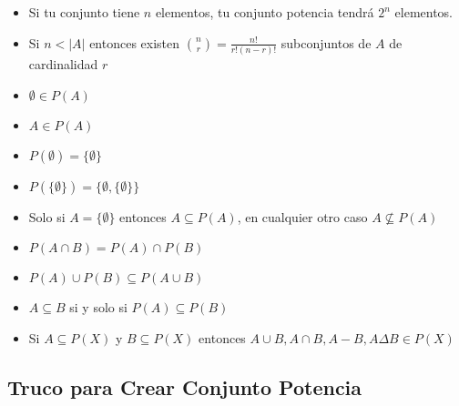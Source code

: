 \documentclass[12pt, fleqn]{report}                             %
\begin{document}
                \begin{itemize}
                    \item Si tu conjunto tiene $n$ elementos, tu conjunto potencia tendrá
                        $2^n$ elementos.

                    \item Si $n < |A|$ entonces existen $\binom{n}{r} = \frac{n!}{r!(n-r)!}$ 
                        subconjuntos de $A$ de cardinalidad $r$

                    \item $\emptyset \in P(A)$

                    \item $A \in P(A)$

                    \item $P(\emptyset) = \{\emptyset\}$

                    \item $P( \{\emptyset\}) = \{\emptyset, \{\emptyset\} \}$

                    \item Solo si $A = \{\emptyset\}$ entonces $A \subseteq P(A)$,
                        en cualquier otro caso $A \nsubseteq P(A)$

                    \item $P(A \cap B) = P(A) \cap P(B)$

                    \item $P(A) \cup P(B) \subseteq P(A \cup B)$

                    \item $A \subseteq B$ si y solo si  $P(A) \subseteq P(B)$ 

                    \item Si $A \subseteq P(X)$ y $B \subseteq P(X)$ entonces 
                    $A \cup B, A \cap B,  A - B,  A \Delta B \in P(X)$

                \end{itemize}



            \clearpage
            \subsection{Truco para Crear Conjunto Potencia}
\end{document}
